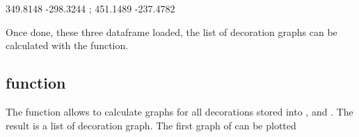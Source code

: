 \documentclass[article]{jss}\usepackage{knitr}
\begin{document}
\begin{kframe}
\begin{alltt}
 \hlkwb{<-}  \hlopt{==}  \hlopt{&}  \hlopt{==} \hlstd{)[,}\hlstd{(}\hlstd{,}\hlstd{)]}
 \hlkwb{<-}  \hlopt{==}  \hlopt{&}  \hlopt{==} \hlstd{)[,}\hlstd{(}\hlstd{,}\hlstd{)]}
\hlstd{(}\hlstd{,}
\end{alltt}
\end{kframe}349.8148 -298.3244 ; 451.1489 -237.4782

Once done, these three dataframe loaded, the list of decoration graphs can be calculated with the  function.

\subsection{ function} \label{sec:funlistdec}

The  function allows to calculate graphs for all decorations stored into ,  and . The result is a list of decoration graph. The first graph of can be plotted
\end{document}
